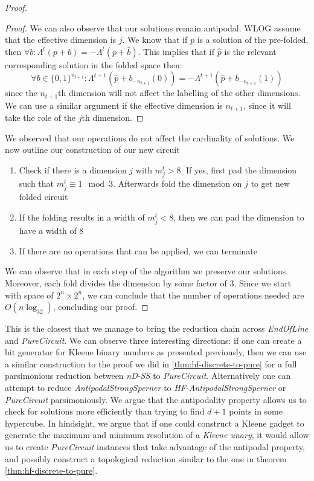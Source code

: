\begin{proof}
\begin{proof}
            We can also observe that our solutions remain antipodal.
            WLOG assume that the effective dimension is $j$. We know that
            if $p$ is a solution of the pre-folded, then
            $\forall b: \Lambda^t(p + b) = - \Lambda^t(p + \bar{b})$. This implies
            that if $\hat{p}$ is the relevant corresponding solution in the folded space then:
            $$
                \forall b \in \{0,1\}^{n_{t+1}}: \Lambda^{t+1}(\hat{p} + b_{-n_{t+1}}(0)) = - \Lambda^{t+1}(\hat{p} + \bar{b}_{-n_{t+1}}(1))
            $$
            since the $n_{t+1}$th dimension will not affect the labelling of the other dimensions.
            We can use a similar argument if the effective dimension is $n_{t+1}$, since it will take
            the role of the $j$th dimension.
        \end{proof}
        We observed that our operations do not affect the cardinality of solutions. We now outline
        our construction of our new circuit
        \begin{enumerate}
            \item Check if there is a dimension  $j$ with $m_j^t > 8$. If yes, first pad the dimension such that $m_j^t \equiv 1 \mod 3$.
                  Afterwards fold the dimension on $j$ to get new folded circuit
            \item If the folding results in a width of $m_j^t <8$, then we can pad the dimension to have a width of $8$
            \item If there are no operations that can be applied, we can terminate
        \end{enumerate}
        We can observe that in each step of the algorithm we preserve our solutions. Moreover, each fold
        divides the dimension by some factor of $3$. Since we start with space of $2^n \times 2^n$,
        we can conclude that the number of operations needed are $O(n\log_32)$, concluding our proof.
    \end{proof}

    This is the closest that we manage to bring the reduction chain across \textit{EndOfLine} and \textit{PureCircuit}.
    We can observe three interesting directions: if one can create a bit generator
    for Kleene binary numbers as presented previously, then we can use a similar construction to
    the proof we did in \ref{thm:hf-discrete-to-pure} for a full parsimonious reduction between
    \textit{nD-SS} to \textit{PureCircuit}.
    Alternatively one can attempt to reduce \textit{AntipodalStrongSperner} to \textit{HF-AntipodalStrongSperner} or \textit{PureCircuit}
    parsimoniously. We argue that the antipodality property allows us to check for solutions
    more efficiently than trying to find $d+1$ points in some hypercube.
In hindsight, we argue that if one could construct a Kleene gadget to generate the maximum and minimum
resolution of a \textit{Kleene unary}, it would allow us to create \textit{PureCircuit} instances
that take advantage of the antipodal property, and possibly construct a topological
reduction similar to the one in theorem \ref{thm:hf-discrete-to-pure}.

